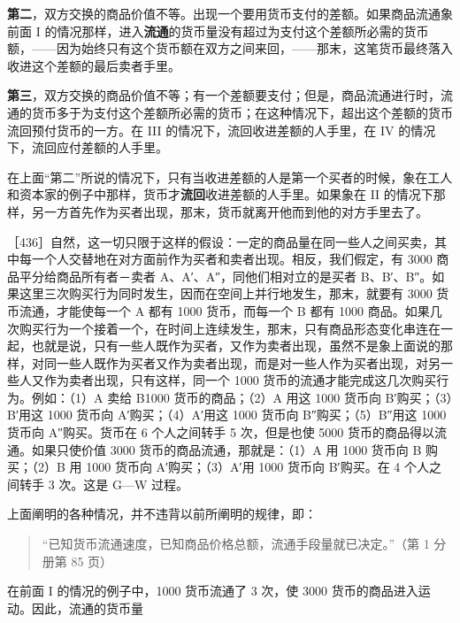 \textbf{第二}，双方交换的商品价值不等。出现一个要用货币支付的差额。如果商品流通象前面 I 的情况那样，进入\textbf{流通}的货币量没有超过为支付这个差额所必需的货币额，——因为始终只有这个货币额在双方之间来回，——那末，这笔货币最终落入收进这个差额的最后卖者手里。

\textbf{第三}，双方交换的商品价值不等；有一个差额要支付；但是，商品流通进行时，流通的货币多于为支付这个差额所必需的货币；在这种情况下，超出这个差额的货币流回预付货币的一方。在 III 的情况下，流回收进差额的人手里，在 IV 的情况下，流回应付差额的人手里。

在上面“第二”所说的情况下，只有当收进差额的人是第一个买者的时候，象在工人和资本家的例子中那样，货币才\textbf{流回}收进差额的人手里。如果象在 II 的情况下那样，另一方首先作为买者出现，那末，货币就离开他而到他的对方手里去了。

［436］\fontbox{~\{}自然，这一切只限于这样的假设：一定的商品量在同一些人之间买卖，其中每一个人交替地在对方面前作为买者和卖者出现。相反，我们假定，有 3000 商品平分给商品所有者－卖者 A、A′、A″，同他们相对立的是买者 B、B′、B″。如果这里三次购买行为同时发生，因而在空间上并行地发生，那末，就要有 3000 货币流通，才能使每一个 A 都有 1000 货币，而每一个 B 都有 1000 商品。如果几次购买行为一个接着一个，在时间上连续发生，那末，只有商品形态变化串连在一起，也就是说，只有一些人既作为买者，又作为卖者出现，虽然不是象上面说的那样，对同一些人既作为买者又作为卖者出现，而是对一些人作为买者出现，对另一些人又作为卖者出现，只有这样，同一个 1000 货币的流通才能完成这几次购买行为。例如：（1）A 卖给 B1000 货币的商品；（2）A 用这 1000 货币向 B′购买；（3）B′用这 1000 货币向 A′购买；（4）A′用这 1000 货币向 B″购买；（5）B″用这 1000 货币向 A″购买。货币在 6 个人之间转手 5 次，但是也使 5000 货币的商品得以流通。如果只使价值 3000 货币的商品流通，那就是：（1）A 用 1000 货币向 B 购买；（2）B 用 1000 货币向 A′购买；（3）A′用 1000 货币向 B′购买。在 4 个人之间转手 3 次。这是 G—W 过程。\fontbox{\}~}

上面阐明的各种情况，并不违背以前所阐明的规律，即：

\begin{quote}“已知货币流通速度，已知商品价格总额，流通手段量就已决定。”（第 1 分册第 85 页）\end{quote}

在前面 I 的情况的例子中，1000 货币流通了 3 次，使 3000 货币的商品进入运动。因此，流通的货币量

